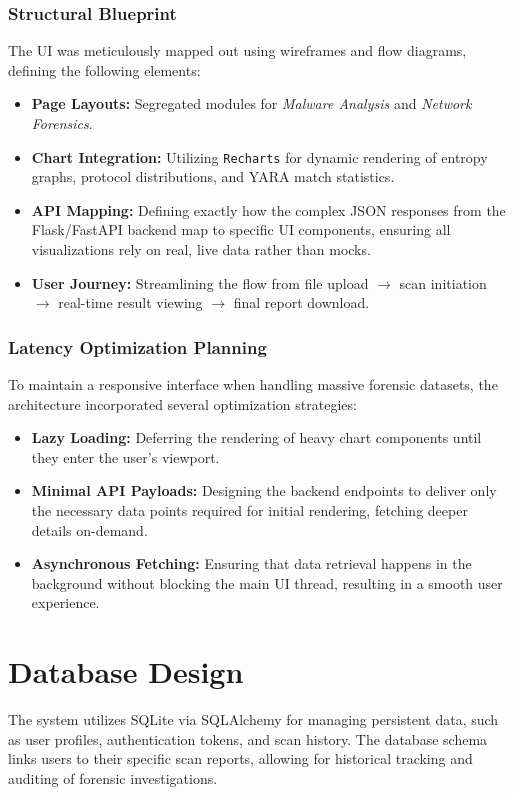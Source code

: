 \subsubsection{Structural Blueprint}
The UI was meticulously mapped out using wireframes and flow diagrams, defining the following elements:
\begin{itemize}
    \item \textbf{Page Layouts:} Segregated modules for \textit{Malware Analysis} and \textit{Network Forensics}.
    \item \textbf{Chart Integration:} Utilizing \texttt{Recharts} for dynamic rendering of entropy graphs, protocol distributions, and YARA match statistics.
    \item \textbf{API Mapping:} Defining exactly how the complex JSON responses from the Flask/FastAPI backend map to specific UI components, ensuring all visualizations rely on real, live data rather than mocks.
    \item \textbf{User Journey:} Streamlining the flow from file upload $\rightarrow$ scan initiation $\rightarrow$ real-time result viewing $\rightarrow$ final report download.
\end{itemize}

\subsubsection{Latency Optimization Planning}
To maintain a responsive interface when handling massive forensic datasets, the architecture incorporated several optimization strategies:
\begin{itemize}
    \item \textbf{Lazy Loading:} Deferring the rendering of heavy chart components until they enter the user's viewport.
    \item \textbf{Minimal API Payloads:} Designing the backend endpoints to deliver only the necessary data points required for initial rendering, fetching deeper details on-demand.
    \item \textbf{Asynchronous Fetching:} Ensuring that data retrieval happens in the background without blocking the main UI thread, resulting in a smooth user experience.
\end{itemize}

\section{Database Design}
The system utilizes SQLite via SQLAlchemy for managing persistent data, such as user profiles, authentication tokens, and scan history. The database schema links users to their specific scan reports, allowing for historical tracking and auditing of forensic investigations.

